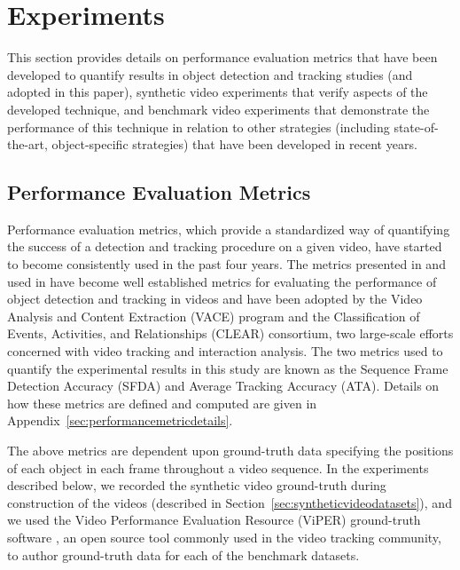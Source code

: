 \documentclass[twocolumn, final]{svjour3}
\begin{document}

\section{Experiments}
\label{sec:experiments}

This section provides details on performance evaluation metrics that have been developed to quantify results in object detection and tracking studies (and adopted in this paper), synthetic video experiments that verify aspects of the developed technique, and benchmark video experiments that demonstrate the performance of this technique in relation to other strategies (including state-of-the-art, object-specific strategies) that have been developed in recent years.   


\subsection{Performance Evaluation Metrics}
\label{sec:performanceevaluationmetrics}

Performance evaluation metrics, which provide a standardized way of quantifying the success of a detection and tracking procedure on a given video, have started to become consistently used in the past four years. The metrics presented in \cite{kasturi_2008} and used in \cite{ellis_2010, taj_2007, lee_2009} have become well established metrics for evaluating the performance of object detection and tracking in videos and have been adopted by the Video Analysis and Content Extraction (VACE) program and the Classification of Events, Activities, and Relationships (CLEAR) consortium, two large-scale efforts concerned with video tracking and interaction analysis. The two metrics used to quantify the experimental results in this study are known as the Sequence Frame Detection Accuracy (SFDA) and Average Tracking Accuracy (ATA). Details on how these metrics are defined and computed are given in Appendix~\ref{sec:performancemetricdetails}.

The above metrics are dependent upon ground-truth data specifying the positions of each object in each frame throughout a video sequence. In the experiments described below, we recorded the synthetic video ground-truth during construction of the videos (described in Section~\ref{sec:syntheticvideodatasets}), and we used the Video Performance Evaluation Resource (ViPER) ground-truth software \cite{doermann_2000}, an open source tool commonly used in the video tracking community, to author ground-truth data for each of the benchmark datasets.
\end{document}
